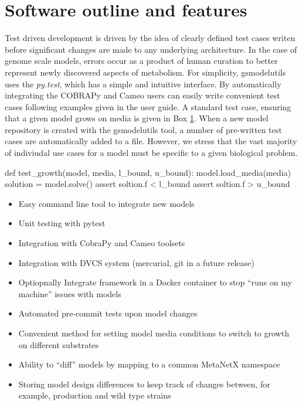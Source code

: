 \documentclass{bioinfo}
\begin{document}
\section{Software outline and features}
Test driven development is driven by the idea of clearly defined test cases writen before significant changes are made to any underlying architecture.
In the case of genome scale models, errors occur as a product of human curation to better represent newly discovered aspects of metabolism.
For simplicity, gsmodelutils uses the \textit{py.test}, which has a simple and intuitive interface.
By automatically integrating the COBRAPy \cite{} and Cameo \cite{} users can easily write convenient test cases following examples given in the user guide.
A standard test case, ensuring that a given model grows on media is given in Box \ref{}.
When a new model repository is created with the gsmodelutils tool, a number of pre-written test cases are automatically added to a file.
However, we stress that the vast majority of indiviudal use cases for a model must be specific to a given biological problem.

\begin{verbatim*}
def test_growth(model, media, l_bound, u_bound):
    model.load_media(media)
    solution = model.solve()
    assert soltion.f < l_bound
    assert soltion.f > u_bound
\end{verbatim*}




\begin{itemize}
 \item Easy command line tool to integrate new models
 \item Unit testing with pytest
 \item Integration with CobraPy and Cameo toolsets
 \item Integration with DVCS system (mercurial, git in a future release)
  \item Optiopnally Integrate framework in a Docker container to stop ``runs on my machine'' issues with models
 \item Automated pre-commit tests upon model changes
 \item Convenient method for setting model media conditions to switch to growth on different substrates
 \item Ability to ``diff'' models by mapping to a common MetaNetX namespace
 \item Storing model design differences to keep track of changes between, for example, production and wild type strains
\end{itemize}
\end{document}
